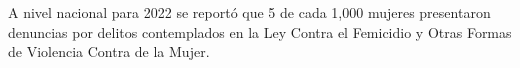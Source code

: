 \justifying A nivel nacional para 2022 se reportó que 5 de cada 1,000 mujeres presentaron denuncias por delitos contemplados en la Ley Contra el Femicidio y Otras Formas de Violencia Contra de la Mujer.